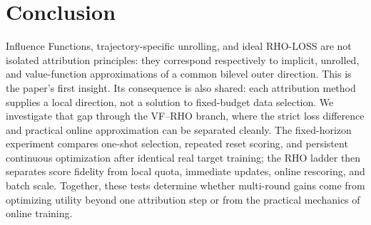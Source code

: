 \section{Conclusion}

Influence Functions, trajectory-specific unrolling, and ideal RHO-LOSS are not
isolated attribution principles: they correspond respectively to implicit,
unrolled, and value-function approximations of a common bilevel outer
direction. This is the paper's first insight. Its consequence is also shared:
each attribution method supplies a local direction, not a solution to
fixed-budget data selection. We investigate that gap through the VF--RHO
branch, where the strict loss difference and practical online approximation can
be separated cleanly. The fixed-horizon experiment compares one-shot
selection, repeated reset scoring, and persistent continuous optimization after
identical real target training; the RHO ladder then separates score fidelity
from local quota, immediate updates, online rescoring, and batch scale.
Together, these tests determine whether multi-round gains come from optimizing
utility beyond one attribution step or from the practical mechanics of online
training.
